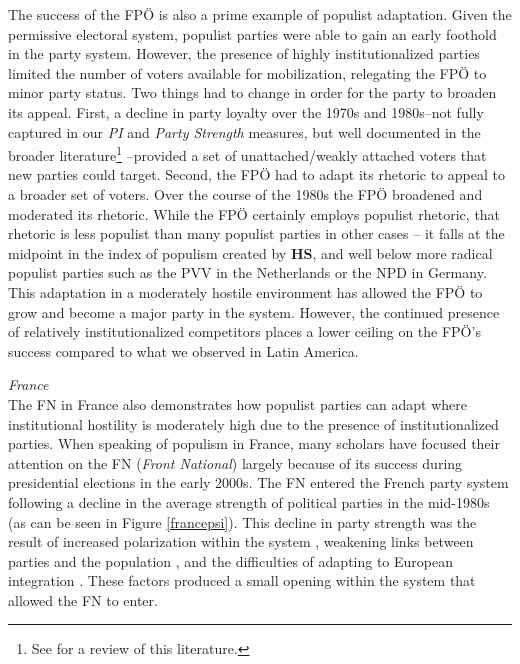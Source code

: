 \documentclass[a4paper,12pt]{article}\usepackage[]{graphicx}\usepackage[]{color}
\begin{document}
\par
The success of the FP\"{O} is also a prime example of populist adaptation. Given the permissive electoral system, populist parties were able to gain an early foothold in the party system. However, the presence of highly institutionalized parties limited the number of voters available for mobilization, relegating the FP\"{O} to minor party status. Two things had to change in order for the party to broaden its appeal. First, a decline in party loyalty over the 1970s and 1980s--not fully captured in our \textit{PI} and \textit{Party Strength} measures, but well documented in the broader literature\footnote{See \citet{muller1993after} for a review of this literature.} --provided a set of unattached/weakly attached voters that new parties could target. Second, the FP\"{O} had to adapt its rhetoric to appeal to a broader set of voters. Over the course of the 1980s the FP\"{O} broadened and moderated its rhetoric. While the FP\"{O} certainly employs populist rhetoric, that rhetoric is less populist than many populist parties in other cases -- it falls at the midpoint in the index of populism created by \textbf{HS}, and well below more radical populist parties such as the PVV in the Netherlands or the NPD in Germany. This adaptation in a moderately hostile environment has allowed the FP\"{O} to grow and become a major party in the system. However, the continued presence of relatively institutionalized competitors places a lower ceiling on the FP\"{O}'s success compared to what we observed in Latin America. 
\par
\noindent
\textit{France}\\
The FN in France also demonstrates how populist parties can adapt where institutional hostility is moderately high due to the presence of institutionalized parties. When speaking of populism in France, many scholars have focused their attention on the FN (\textit{Front National}) largely because of its success during presidential elections in the early 2000s. The FN entered the French party system following a decline in the average strength of political parties in the mid-1980s (as can be seen in Figure \ref{francepsi}). This decline in party strength was the result of increased polarization within the system \citep{knapp2004parties}, weakening links between parties and the population \citep{grunberg2008french}, and the difficulties of adapting to European integration \citep{bornschier2009evolution}. These factors produced a small opening within the system that allowed the FN to enter. 
\end{document}
